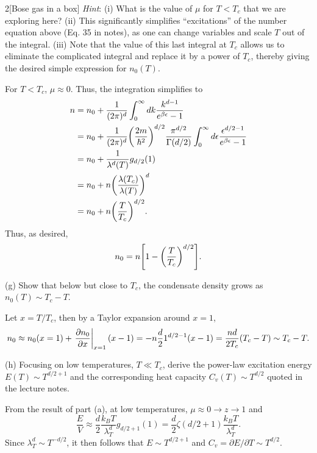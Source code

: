 \documentclass[12pt]{article}
\begin{document}
\begin{problem}{2}[Bose gas in a box]
\textit{Hint}: (i) What is the value of $\mu$ for $T<T_c$ that we are exploring
here? (ii) This significantly simplifies ``excitations'' of the number equation
above (Eq. 35 in notes), as one can change variables and scale $T$ out of the
integral. (iii) Note that the value of this last integral at $T_c$ allows us to
eliminate the complicated integral and replace it by a power of $T_c$, thereby
giving the desired simple expression for $n_0(T)$.
\begin{solution}
For $T<T_c$, $\mu\approx 0$. Thus, the integration simplifies to
\begin{align}
    n
    &=n_0+\frac1{(2\pi)^d}\int_0^\infty dk \frac{k^{d-1}}{e^{\beta\epsilon}-1}\notag\\
    &=n_0+\frac1{(2\pi)^d}\qty(\frac{2m}{\hbar^2})^{d/2}\frac{\pi^{d/2}}{\Gamma(d/2)}\int_0^\infty
    d\epsilon\frac{\epsilon^{d/2-1}}{e^{\beta\epsilon}-1}\notag\\
    &=n_0+\frac1{\lambda^d(T)}g_{d/2}(1)\notag\\
    &=n_0+n\qty(\frac{\lambda(T_c)}{\lambda(T)})^d\notag\\
    &=n_0+n\qty(\frac{T}{T_c})^{d/2}.
\end{align}
Thus, as desired,
\begin{equation}
    n_0=n\qty[1-\qty(\frac{T}{T_c})^{d/2}]. 
\end{equation}
\end{solution}

(g) Show that below but close to $T_c$, the condensate density grows as
$n_0(T)\sim T_c-T$.
\begin{solution}
Let $x=T/T_c$, then by a Taylor expansion around $x=1$,
\begin{equation}
    n_0\approx n_0(x=1)+\eval{\frac{\partial n_0}{\partial x}}_{x=1}(x-1)
    =-n\frac{d}{2}1^{d/2-1}(x-1)
    =\frac{nd}{2T_c}(T_c-T)
    \sim T_c-T.
\end{equation}
\end{solution}

(h) Focusing on low temperatures, $T\ll T_c$, derive the power-law excitation
energy $E(T)\sim T^{d/2+1}$ and the corresponding heat capacity $C_v(T)\sim
T^{d/2}$ quoted in the lecture notes.
\begin{solution}
From the result of part (a), at low temperatures, $\mu\approx 0\rightarrow
z\to1$ and
\begin{equation}
    \frac{E}{V}\approx\frac{d}{2}\frac{k_BT}{\lambda_T^d}g_{d/2+1}(1)
    =\frac{d}{2}\zeta(d/2+1)\frac{k_BT}{\lambda_T^d}.
\end{equation}
Since $\lambda_T^d\sim T^{-d/2}$, it then follows that $E\sim T^{d/2+1}$ and
$C_v=\partial E/\partial T\sim T^{d/2}$.
\end{solution}

\end{problem}
\newpage
\end{document}
